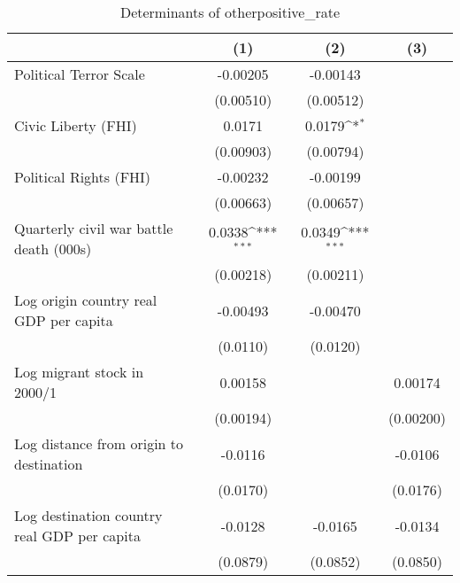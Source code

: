 \begin{table}[htbp]\centering
\def\sym#1{\ifmmode^{#1}\else\(^{#1}\)\fi}
\caption{Determinants of otherpositive\_rate}
\begin{tabular}{l*{3}{c}}
\hline\hline
                    &\multicolumn{1}{c}{(1)}         &\multicolumn{1}{c}{(2)}         &\multicolumn{1}{c}{(3)}         \\
\hline
Political Terror Scale&    -0.00205         &    -0.00143         &                     \\
                    &   (0.00510)         &   (0.00512)         &                     \\
[1em]
Civic Liberty (FHI) &      0.0171         &      0.0179\sym{*}  &                     \\
                    &   (0.00903)         &   (0.00794)         &                     \\
[1em]
Political Rights (FHI)&    -0.00232         &    -0.00199         &                     \\
                    &   (0.00663)         &   (0.00657)         &                     \\
[1em]
Quarterly civil war battle death (000s)&      0.0338\sym{***}&      0.0349\sym{***}&                     \\
                    &   (0.00218)         &   (0.00211)         &                     \\
[1em]
Log origin country real GDP per capita&    -0.00493         &    -0.00470         &                     \\
                    &    (0.0110)         &    (0.0120)         &                     \\
[1em]
Log migrant stock in 2000/1&     0.00158         &                     &     0.00174         \\
                    &   (0.00194)         &                     &   (0.00200)         \\
[1em]
Log distance from origin to destination&     -0.0116         &                     &     -0.0106         \\
                    &    (0.0170)         &                     &    (0.0176)         \\
[1em]
Log destination country real GDP per capita&     -0.0128         &     -0.0165         &     -0.0134         \\
                    &    (0.0879)         &    (0.0852)         &    (0.0850)         \\

\end{tabular}
\end{table}
